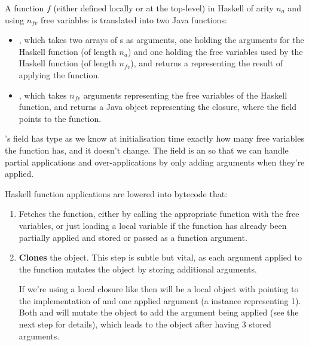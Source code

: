 \documentclass[dissertation.tex]{subfiles}
\begin{document}
{{{            A function \(f\) (either defined locally or at the top-level) in Haskell of arity \(n_a\) and using \(n_{fv}\) free variables is translated into two Java functions:
            
            \begin{itemize}
            \item
            {
                , which takes two arrays of s as arguments, one holding the arguments for the Haskell function (of length \(n_a\)) and one holding the free variables used by the Haskell function (of length \(n_{fv}\)), and returns a  representing the result of applying the function.
            }
            \item
            {
                , which takes \(n_{fv}\) arguments representing the free variables of the Haskell function, and returns a Java  object representing the closure, where the  field points to the  function.
            }
            \end{itemize}
            
            's  field has type  as we know at initialisation time exactly how many free variables the function has, and it doesn't change. The  field is an  so that we can handle partial applications and over-applications by only adding arguments when they're applied.

            Haskell function applications are lowered into bytecode that:
            \begin{enumerate}
            \item
            {
                Fetches the function, either by calling the appropriate  function with the free variables, or just loading a local variable if the function has already been partially applied and stored or passed as a function argument.
            }
            \item
            {
                \textbf{Clones} the  object. This step is subtle but vital, as each argument applied to the function mutates the  object by storing additional arguments.
                
                If we're using a local closure like  then  will be a local  object with  pointing to the implementation of \haskell{(+)} and one applied argument (a  instance representing 1). Both  and  will mutate the object to add the argument being applied (see the next step for details), which leads to the  object after  having 3 stored arguments.

}
\end{enumerate}}}}
\end{document}
